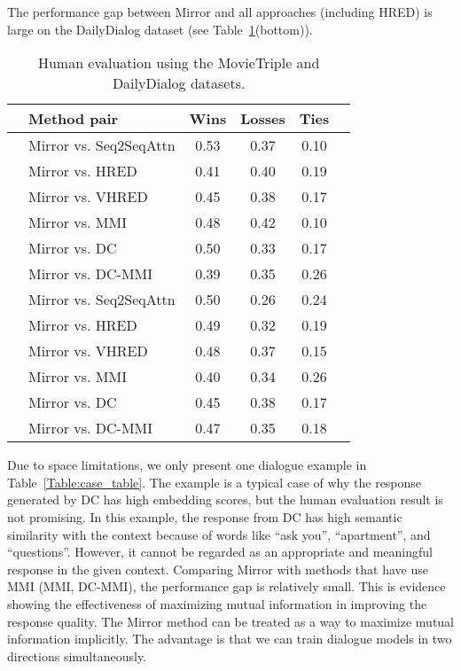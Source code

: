\documentclass[sigconf]{acmart}
\begin{document}
The performance gap between Mirror and all approaches (including HRED) is large on the DailyDialog dataset (see Table~\ref{Table:results}(bottom)). 
%
\begin{table}[t]
\caption{Human evaluation using the MovieTriple and DailyDialog datasets.} 
\label{Table:results}
  \centering
\begin{tabular}{l l*{4}{c}}
\toprule
& \textbf{Method pair} & Wins  & Losses &Ties  \\
\midrule
\parbox[t]{4mm}{} 
& Mirror vs. Seq2SeqAttn  &0.53 &0.37 &0.10 \\
& Mirror vs. HRED  &0.41 &0.40 &0.19 \\
& Mirror vs. VHRED  &0.45 &0.38 &0.17 \\
& Mirror vs. MMI  &0.48 &0.42 &0.10 \\
& Mirror vs. DC  &0.50 &0.33 &0.17 \\
& Mirror vs. DC-MMI &0.39 &0.35 &0.26 \\
\midrule
\parbox[t]{4mm}{} 
& Mirror vs. Seq2SeqAttn  &0.50 &0.26 &0.24 \\
& Mirror vs. HRED  &0.49 &0.32 &0.19 \\
& Mirror vs. VHRED  &0.48 &0.37 &0.15 \\
& Mirror vs. MMI  &0.40 &0.34 &0.26 \\
& Mirror vs. DC  &0.45 &0.38 &0.17 \\
& Mirror vs. DC-MMI &0.47 &0.35 &0.18 \\
\bottomrule
\end{tabular} 
 \vspace*{-0.5\baselineskip}
\end{table}
%
Due to space limitations, we only present one dialogue example in Table~\ref{Table:case_table}. The example is a typical case of why the response generated by DC has high embedding scores, but the human evaluation result is not promising. In this example, the response from DC has high semantic similarity with the context because of words like ``ask you'', ``apartment'', and ``questions''. However, it cannot be regarded as an appropriate and meaningful response in the given context. Comparing Mirror with methods that have use MMI (MMI, DC-MMI), the performance gap is relatively small. This is evidence showing the effectiveness of maximizing mutual information in improving the response quality. The Mirror method can be treated as a way to maximize mutual information implicitly. The advantage is that we can train dialogue models in two directions simultaneously.  
\end{document}
